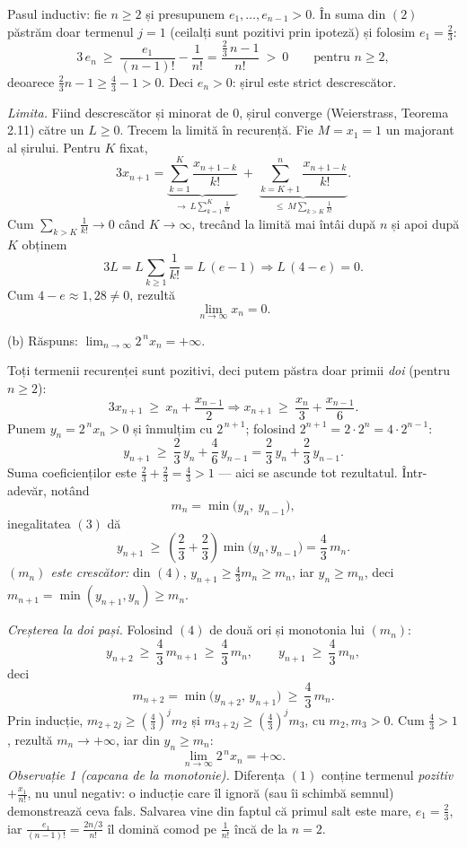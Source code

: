 Pasul inductiv: fie $n\ge2$ și presupunem $e_1,\dots,e_{n-1}>0$. În suma din $(2)$ păstrăm doar termenul $j=1$ (ceilalți sunt pozitivi prin ipoteză) și folosim $e_1=\frac23$:
\[ 3\,e_n\ \ge\ \frac{e_1}{(n-1)!}-\frac{1}{n!}=\frac{\frac23\,n-1}{n!}\ >\ 0\qquad\text{pentru }n\ge2 , \]
deoarece $\frac23 n-1\ge\frac43-1>0$. Deci $e_n>0$: șirul este strict descrescător.

\emph{Limita.} Fiind descrescător și minorat de $0$, șirul converge (Weierstrass, Teorema 2.11) către un $L\ge0$. Trecem la limită în recurență. Fie $M=x_1=1$ un majorant al șirului. Pentru $K$ fixat,
\[ 3x_{n+1}=\underbrace{\sum_{k=1}^{K}\frac{x_{n+1-k}}{k!}}_{\to\ L\sum_{k=1}^{K}\frac1{k!}}\ +\ \underbrace{\sum_{k=K+1}^{n}\frac{x_{n+1-k}}{k!}}_{\le\ M\sum_{k>K}\frac1{k!}} . \]
Cum $\sum_{k>K}\frac1{k!}\to0$ când $K\to\infty$, trecând la limită mai întâi după $n$ și apoi după $K$ obținem
\[ 3L=L\sum_{k\ge1}\frac1{k!}=L\,(e-1) \Longrightarrow L\,(4-e)=0 . \]
Cum $4-e\approx1{,}28\neq0$, rezultă
\[ \lim_{n\to\infty}x_n=0 . \]

(b) Răspuns: $\displaystyle\lim_{n\to\infty}2^{\,n}x_n=+\infty$.

Toți termenii recurenței sunt pozitivi, deci putem păstra doar primii \emph{doi} (pentru $n\ge2$):
\[ 3x_{n+1}\ \ge\ x_n+\frac{x_{n-1}}{2} \Longrightarrow x_{n+1}\ \ge\ \frac{x_n}{3}+\frac{x_{n-1}}{6} . \]
Punem $y_n=2^{\,n}x_n>0$ și înmulțim cu $2^{\,n+1}$; folosind $2^{n+1}=2\cdot2^n=4\cdot2^{n-1}$:
\[ y_{n+1}\ \ge\ \frac{2}{3}\,y_n+\frac{4}{6}\,y_{n-1}=\frac{2}{3}\,y_n+\frac{2}{3}\,y_{n-1} . \tag{3} \]
Suma coeficienților este $\frac23+\frac23=\frac43>1$ --- aici se ascunde tot rezultatul. Într-adevăr, notând
\[ m_n=\min\bigl(y_n,\ y_{n-1}\bigr) , \]
inegalitatea $(3)$ dă
\[ y_{n+1}\ \ge\ \left(\frac23+\frac23\right)\min\bigl(y_n,y_{n-1}\bigr)=\frac43\,m_n . \tag{4} \]
\emph{$(m_n)$ este crescător:} din $(4)$, $y_{n+1}\ge\frac43m_n\ge m_n$, iar $y_n\ge m_n$, deci $m_{n+1}=\min(y_{n+1},y_n)\ge m_n$.

\emph{Creșterea la doi pași.} Folosind $(4)$ de două ori și monotonia lui $(m_n)$:
\[ y_{n+2}\ \ge\ \frac43\,m_{n+1}\ \ge\ \frac43\,m_n,\qquad y_{n+1}\ \ge\ \frac43\,m_n , \]
deci
\[ m_{n+2}=\min\bigl(y_{n+2},\,y_{n+1}\bigr)\ \ge\ \frac43\,m_n . \]
Prin inducție, $m_{2+2j}\ge\left(\frac43\right)^{j}m_2$ și $m_{3+2j}\ge\left(\frac43\right)^{j}m_3$, cu $m_2,m_3>0$. Cum $\frac43>1$, rezultă $m_n\to+\infty$, iar din $y_n\ge m_n$:
\[ \lim_{n\to\infty}2^{\,n}x_n=+\infty . \]
\emph{Observație 1 (capcana de la monotonie).} Diferența $(1)$ conține termenul \emph{pozitiv} $+\frac{x_1}{n!}$, nu unul negativ: o inducție care îl ignoră (sau îi schimbă semnul) demonstrează ceva fals. Salvarea vine din faptul că primul salt este mare, $e_1=\frac23$, iar $\frac{e_1}{(n-1)!}=\frac{2n/3}{n!}$ îl domină comod pe $\frac1{n!}$ încă de la $n=2$.

